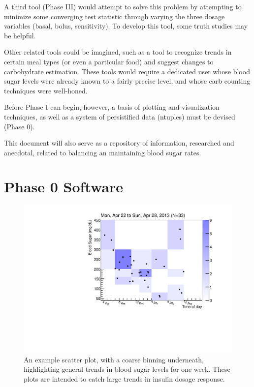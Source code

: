A third tool (Phase III) would attempt to solve this problem by attempting to minimize some 
converging test statistic through varying the three dosage variables (basal, bolus, sensitivity). To 
develop this tool, some truth studies may be helpful.

Other related tools could be imagined, such as a tool to recognize trends in certain meal types (or 
even a particular food) and suggest changes to carbohydrate estimation. These tools would require a 
dedicated user whose blood sugar levels were already known to a fairly precise level, and whose carb 
counting techniques were well-honed.

Before Phase I can begin, however, a basis of plotting and visualization techniques, as well as a 
system of persistified data (ntuples) must be devised (Phase 0).

This document will also serve as a repository of information, researched and anecdotal, related to 
balancing an maintaining blood sugar rates.


\section{Phase 0 Software}

\begin{figure}[htbp]
\begin{center}
\includegraphics[width=4.5in]{figures/example_weekly.pdf}
\caption{An example scatter plot, with a coarse binning underneath, highlighting general trends in 
blood sugar levels for one week. These plots are intended to catch large trends in insulin dosage 
response.}
\label{default}
\end{center}
\end{figure}

